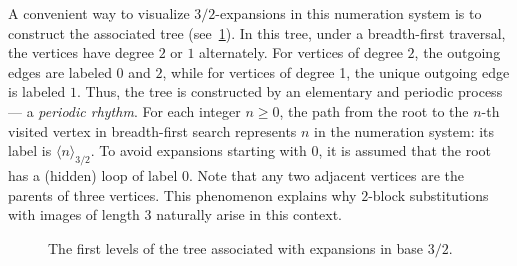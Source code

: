 \documentclass[12pt,reqno]{article}
\begin{document}
A convenient way to visualize $3/2$-expansions in this numeration system is to construct the associated tree (see~\cref{fig:tree32}).
In this tree, under a breadth-first traversal, the vertices have degree $2$ or $1$ alternately. For vertices of degree $2$, the outgoing edges are labeled $0$ and $2$, while for vertices of degree 1, the unique outgoing edge is labeled $1$. Thus, the tree is constructed by an elementary and periodic process --- a \emph{periodic rhythm}.  For each integer $n\ge 0$,  the path from the root to the $n$-th visited vertex in breadth-first search represents $n$ in the numeration system: its label is $\langle n \rangle_{3/2}$. To avoid expansions starting with $0$, it is assumed that the root has a (hidden) loop of label $0$.
Note that any two adjacent vertices are the parents of three vertices. This phenomenon explains why $2$-block substitutions with images of length $3$ naturally arise in this context.

\begin{figure}[h!t]
  \centering
  \caption{The first levels of the tree associated with expansions in base $3/2$.}
  \label{fig:tree32}
\end{figure}
\end{document}
